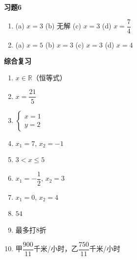 \documentclass[a4paper,12pt]{ctexart}
\begin{document}
\textbf{习题6}
\begin{enumerate}
\item[(1)] (a) $x=3$ \qquad (b) 无解 \qquad (c) $x=3$ \qquad (d) $x=\dfrac74$
\item[(2)] (a) $x=5$ \qquad (b) $x=3$ \qquad (c) $x=3$ \qquad (d) $x=4$
\end{enumerate}

\textbf{综合复习}
\begin{enumerate}
\item $x\in\mathbb R$（恒等式）
\item $x=\dfrac{21}{5}$
\item $\begin{cases}x=1\\ y=2\end{cases}$
\item $x_1=7$, $x_2=-1$
\item $3<x\le5$
\item $x_1=-\dfrac12$, $x_2=3$
\item $x_1=0$, $x_2=4$
\item $54$
\item 最多打$8$折
\item 甲$\dfrac{900}{11}$千米/小时，乙$\dfrac{750}{11}$千米/小时
\end{enumerate}
\end{document}
